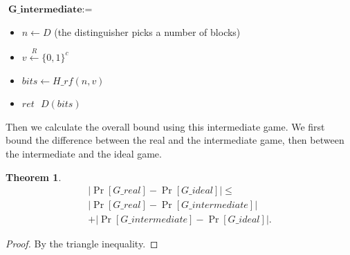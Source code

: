 \documentclass[12pt,lot, lof]{puthesis}
\newenvironment{game}
{ \begin{itemize}[noitemsep,nolistsep] 
}
{ \end{itemize}                  }
\newcommand{\s} {\textrm{ }}
\newtheorem{thm}{Theorem}
\begin{document}
$\textbf{G\_intermediate} := $
\begin{game}
\item[] $n \leftarrow D$ (the distinguisher picks a number of blocks)
\item[] $v \xleftarrow{R} \{0,1\}^c$
\item[] $bits \leftarrow H\_{rf}(n,v)$
\item[] $ret \s D(bits)$ \\
\end{game}

Then we calculate the overall bound using this intermediate game. We first bound the difference between the real and the intermediate game, then between the intermediate and the ideal game.

\begin{thm} \begin{gather*}| \Pr[G\_real] - \Pr[G\_ideal]| \leq \\
|\Pr[G\_real] - \Pr[G\_intermediate]| \\
+  |\Pr[G\_intermediate] - \Pr[G\_ideal]|. \end{gather*} \end{thm}
\begin{proof} By the triangle inequality. \end{proof}
\end{document}
